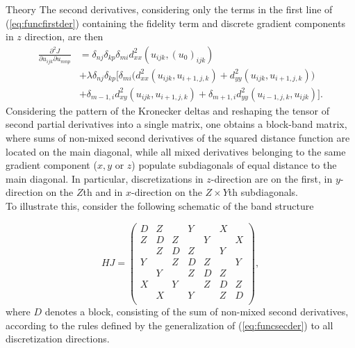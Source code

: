 \begin{chapter}{Theory}
The second derivatives, considering only the terms in the first line of (\ref{eq:funcfirstder}) containing the fidelity term and discrete gradient components in $z$ direction, are then
\begin{align}
    \label{eq:funcsecder}
    \frac{\partial^2 J}{\partial u_{ijk}\partial u_{mnp}} &=  \delta_{nj}\delta_{kp}\delta_{mi}d^2_{xx}(u_{ijk},(u_0)_{ijk}) \\
    &+\lambda\delta_{nj}\delta_{kp}
    \bigg[ 
	\delta_{mi} \bigg(d_{xx}^2(u_{ijk},u_{i+1,j,k}) +d_{yy}^2(u_{ijk},u_{i+1,j,k}) \bigg)\\
    &+  \delta_{m-1,i}d_{xy}^2(u_{ijk},u_{i+1,j,k}) +\delta_{m+1,i} d_{yy}^2(u_{i-1,j,k},u_{ijk})
    \bigg].
\end{align}
Considering the pattern of the Kronecker deltas and reshaping the tensor of second partial derivatives into a single matrix, one 
obtains a block-band matrix, where sums of non-mixed second derivatives of the squared distance function are located on the main diagonal, while all mixed
derivatives belonging to the same gradient component ($x,y$ or $z$) populate subdiagonals of equal distance to the main diagonal.
In particular, discretizations in $z$-direction are on the first, in $y$-direction on the $Z$th and in $x$-direction on the $Z\times Y$th subdiagonals.\\

To illustrate this, consider the following schematic of the band structure

\begin{equation}
    HJ=
\begin{pmatrix}
D	& Z	    & 		& Y	    & 		& X	    & 	   \\
Z	& D	    & Z		& 	    & Y		& 	    & X	  \\
	& Z	    & D	    & Z	    & 		& Y	    & 	 \\
Y	& 	    & Z		& D	    & Z		& 	    & Y	\\
	& Y	    & 		& Z	    & D		& Z	    & 	\\
X	& 	    & Y		& 	    & Z		& D	    & Z	\\
	& X	    & 		& Y	    & 		& Z	    & D	\\
\end{pmatrix},
\end{equation}
where $D$ denotes a block, consisting of the sum of non-mixed second derivatives, according to the rules defined by the generalization of (\ref{eq:funcsecder}) to all 
discretization directions.\\


\end{chapter}
